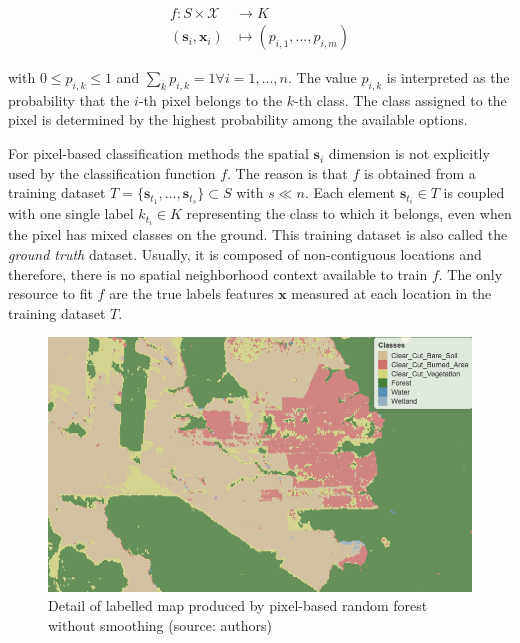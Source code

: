 \documentclass[
  shortnames]{jss}
\begin{document}
\begin{align}
f\colon S \times \mathcal{X} & \longrightarrow K \nonumber \\
(\mathbf{s}_i, \mathbf{x}_i) & \longmapsto (p_{i,1}, \ldots, p_{i,m}) 
\label{eq:classificationf}
\end{align}

with \(0 \leq p_{i,k} \leq 1\) and \(\sum_k p_{i,k} = 1 \forall i = 1, \ldots, n\). The value \(p_{i,k}\) is interpreted as the probability that the \(i\)-th pixel belongs to the \(k\)-th class. The class assigned to the pixel is determined by the highest probability among the available options.

For pixel-based classification methods the spatial \(\mathbf{s}_i\) dimension is not explicitly used by the classification function \(f\). The reason is that \(f\) is obtained from a training dataset \(T = \{ \mathbf{s}_{t_1}, \ldots, \mathbf{s}_{t_s} \} \subset S\) with \(s \ll n\). Each element \(\mathbf{s}_{t_i} \in T\) is coupled with one single label \(k_{t_i} \in K\) representing the class to which it belongs, even when the pixel has mixed classes on the ground. This training dataset is also called the \textit{ground truth} dataset. Usually, it is composed of non-contiguous locations and therefore, there is no spatial neighborhood context available to train \(f\). The only resource to fit \(f\) are the true labels features \(\mathbf{x}\) measured at each location in the training dataset \(T\).

\begin{CodeChunk}
\begin{figure}[!h]

{\centering \includegraphics[width=0.7\linewidth]{images/map_no_smooth_v2} 

}

\caption[Detail of labelled map produced by pixel-based random forest without smoothing (source]{Detail of labelled map produced by pixel-based random forest without smoothing (source: authors)}\label{fig:mapnosmooth}
\end{figure}
\end{CodeChunk}
\end{document}
